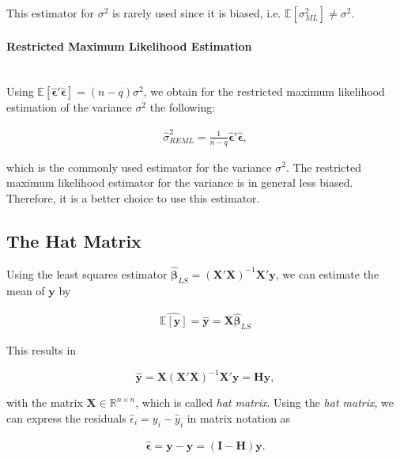 \documentclass[10pt,a4paper]{article}
\newcommand{\subsubsubsection}[1]{\paragraph{#1}\mbox{}\\}
\begin{document}
This estimator for $\sigma^2$ is rarely used since it is biased, i.e. $\mathbb{E}[\sigma^2_{ML}] \ne \sigma^2$. 

\subsubsubsection{Restricted Maximum Likelihood Estimation}

Using $\mathbb{E}[\boldsymbol{\hat{\epsilon}}' \boldsymbol{\hat{\epsilon}}] = (n - q)\sigma^2$, we obtain for the restricted maximum likelihood estimation of the variance $\sigma^2$ the following:

\begin{align} \label{eq:sigma_REML}
	\hat \sigma^2_{REML} = \frac{1}{n-q} \boldsymbol{\hat{\epsilon}}' \boldsymbol{\hat{\epsilon}},
\end{align}

which is the commonly used estimator for the variance $\sigma^2$. The restricted maximum likelihood estimator for the variance is in general less biased. Therefore, it is a better choice to use this estimator.

\subsection{The Hat Matrix}

Using the least squares estimator $\boldsymbol{\hat{\beta}}_{LS} = (\boldsymbol{X}'\boldsymbol{X})^{-1}\boldsymbol{X}'\boldsymbol{y}$, we can estimate the mean of $\boldsymbol{y}$ by 

\begin{align} \label{eq:mean_of_y}
	\widehat{\mathbb{E}[\boldsymbol{y}]} = \boldsymbol{\hat{y}} = \boldsymbol{X} \boldsymbol{\hat{\beta}}_{LS}
\end{align}

This results in 

\begin{equation} \label{HatMatrix}
	\boldsymbol{\hat{y}} = \boldsymbol{X}(\boldsymbol{X}'\boldsymbol{X})^{-1}\boldsymbol{X}'\boldsymbol{y} = \boldsymbol{H} \boldsymbol{y},
\end{equation}

with the matrix $\boldsymbol{X} \in \mathbb{R}^{n \times n}$, which is called \emph{hat matrix}. Using the \emph{hat matrix}, we can express the residuals $\hat \epsilon_i = y_i - \hat y_i$ in matrix notation as

\begin{align} \label{eq:residal_with_hat_matrix}
	\boldsymbol{\hat{\epsilon}} = \boldsymbol{y} - \boldsymbol{y} = (\boldsymbol{I} - \boldsymbol{H}) \boldsymbol{y}.
\end{align}
\end{document}
